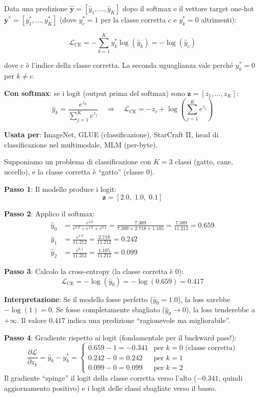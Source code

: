 \documentclass[12pt,a4paper]{article}
\begin{document}
\begin{formulabox}
Data una predizione $\hat{\mathbf{y}} = [\hat{y}_1, \ldots, \hat{y}_K]$ dopo il softmax e il vettore target one-hot $\mathbf{y}^* = [y_1^*, \ldots, y_K^*]$ (dove $y_c^* = 1$ per la classe corretta $c$ e $y_k^* = 0$ altrimenti):

\[
\mathcal{L}_{\text{CE}} = -\sum_{k=1}^{K} y_k^* \log(\hat{y}_k) = -\log(\hat{y}_c)
\]

dove $c$ \`e l'indice della classe corretta. La seconda uguaglianza vale perch\'e $y_k^* = 0$ per $k \neq c$.

\textbf{Con softmax}: se i logit (output prima del softmax) sono $\mathbf{z} = [z_1, \ldots, z_K]$:
\[
\hat{y}_k = \frac{e^{z_k}}{\sum_{j=1}^K e^{z_j}} \quad \Rightarrow \quad \mathcal{L}_{\text{CE}} = -z_c + \log\left(\sum_{j=1}^K e^{z_j}\right)
\]

\textbf{Usata per}: ImageNet, GLUE (classificazione), StarCraft II, head di classificazione nel multimodale, MLM (per-byte).
\end{formulabox}

\begin{examplebox}
Supponiamo un problema di classificazione con $K = 3$ classi (gatto, cane, uccello), e la classe corretta \`e ``gatto'' (classe 0).

\textbf{Passo 1}: Il modello produce i logit:
\[
\mathbf{z} = [2.0, \; 1.0, \; 0.1]
\]

\textbf{Passo 2}: Applico il softmax:
\begin{align*}
\hat{y}_0 &= \frac{e^{2.0}}{e^{2.0} + e^{1.0} + e^{0.1}} = \frac{7.389}{7.389 + 2.718 + 1.105} = \frac{7.389}{11.212} = 0.659 \\
\hat{y}_1 &= \frac{e^{1.0}}{11.212} = \frac{2.718}{11.212} = 0.242 \\
\hat{y}_2 &= \frac{e^{0.1}}{11.212} = \frac{1.105}{11.212} = 0.099
\end{align*}

\textbf{Passo 3}: Calcolo la cross-entropy (la classe corretta \`e 0):
\[
\mathcal{L}_{\text{CE}} = -\log(\hat{y}_0) = -\log(0.659) = 0.417
\]

\textbf{Interpretazione}: Se il modello fosse perfetto ($\hat{y}_0 = 1.0$), la loss sarebbe $-\log(1) = 0$. Se fosse completamente sbagliato ($\hat{y}_0 \to 0$), la loss tenderebbe a $+\infty$. Il valore $0.417$ indica una predizione ``ragionevole ma migliorabile''.

\textbf{Passo 4}: Gradiente rispetto ai logit (fondamentale per il backward pass!):
\[
\frac{\partial \mathcal{L}}{\partial z_k} = \hat{y}_k - y_k^* = \begin{cases} 0.659 - 1 = -0.341 & \text{per } k = 0 \text{ (classe corretta)} \\ 0.242 - 0 = 0.242 & \text{per } k = 1 \\ 0.099 - 0 = 0.099 & \text{per } k = 2 \end{cases}
\]
Il gradiente ``spinge'' il logit della classe corretta verso l'alto ($-0.341$, quindi aggiornamento positivo) e i logit delle classi sbagliate verso il basso.
\end{examplebox}
\end{document}
